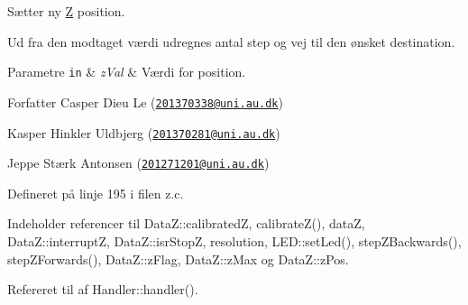 Sætter ny \hyperlink{class_z}{Z} position. 

Ud fra den modtaget værdi udregnes antal step og vej til den ønsket destination. 
\begin{DoxyParams}[1]{Parametre}
\mbox{\tt in}  & {\em z\+Val} & Værdi for position.\\
\hline
\end{DoxyParams}
\begin{DoxyAuthor}{Forfatter}
Casper Dieu Le (\href{mailto:201370338@uni.au.dk}{\tt 201370338@uni.\+au.\+dk}) 

Kasper Hinkler Uldbjerg (\href{mailto:201370281@uni.au.dk}{\tt 201370281@uni.\+au.\+dk}) 

Jeppe Stærk Antonsen (\href{mailto:201271201@uni.au.dk}{\tt 201271201@uni.\+au.\+dk}) 
\end{DoxyAuthor}


Defineret på linje 195 i filen z.\+c.



Indeholder referencer til Data\+Z\+::calibratedZ, calibrate\+Z(), dataZ, Data\+Z\+::interruptZ, Data\+Z\+::isr\+StopZ, resolution, L\+E\+D\+::set\+Led(), step\+Z\+Backwards(), step\+Z\+Forwards(), Data\+Z\+::z\+Flag, Data\+Z\+::z\+Max og Data\+Z\+::z\+Pos.



Refereret til af Handler\+::handler().


